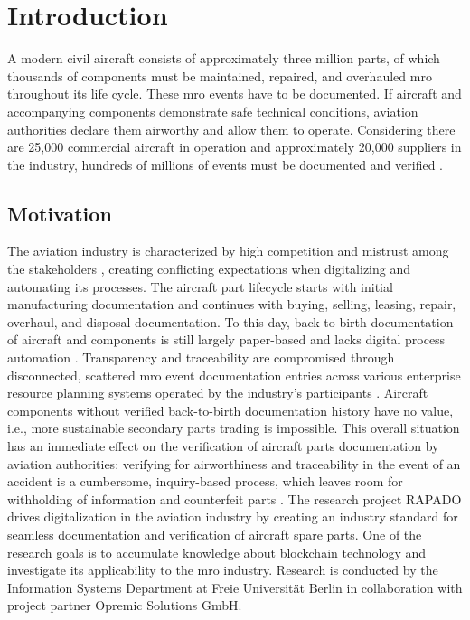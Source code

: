 \chapter{Introduction}
A modern civil aircraft consists of approximately three million parts, of which thousands of components must be maintained, repaired, and overhauled \acrshort{mro} throughout its life cycle. These \acrshort{mro} events have to be documented. If aircraft and accompanying components demonstrate safe technical conditions, aviation authorities declare them airworthy and allow them to operate. Considering there are 25,000 commercial aircraft in operation and approximately 20,000 suppliers in the industry, hundreds of millions of events must be documented and verified \citep{mroBCservices1}.
\section{Motivation}
The aviation industry is characterized by high competition and mistrust among the stakeholders \citep{Chatzi2019TDoC}, creating conflicting expectations when digitalizing and automating its processes. The aircraft part lifecycle starts with initial manufacturing documentation and continues with buying, selling, leasing, repair, overhaul, and disposal documentation. To this day, back-to-birth documentation of aircraft and components is still largely paper-based and lacks digital process automation \citep{efthymiou}. Transparency and traceability are compromised through disconnected, scattered \acrshort{mro} event documentation entries across various enterprise resource planning systems operated by the industry's participants \citep{mroBCservices1}. Aircraft components without verified back-to-birth documentation history have no value, i.e., more sustainable secondary parts trading is impossible. This overall situation has an immediate effect on the verification of aircraft parts documentation by aviation authorities: verifying for airworthiness and traceability in the event of an accident is a cumbersome, inquiry-based process, which leaves room for withholding of information and counterfeit parts \citep{planecrash}. 
The research project RAPADO drives digitalization in the aviation industry by creating an industry standard for seamless documentation and verification of aircraft spare parts. One of the research goals is to accumulate knowledge about blockchain technology and investigate its applicability to the \acrshort{mro} industry. Research is conducted by the Information Systems Department at Freie Universit{\"a}t Berlin in collaboration with project partner Opremic Solutions GmbH.

